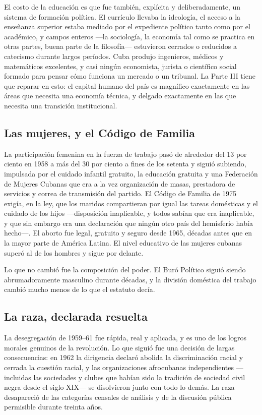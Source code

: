 El costo de la educación es que fue también, explícita y deliberadamente, un
sistema de formación política. El currículo llevaba la ideología, el acceso a la
enseñanza superior estaba mediado por el expediente político tanto como por el
académico, y campos enteros ---la sociología, la economía tal como se practica en
otras partes, buena parte de la filosofía--- estuvieron cerrados o reducidos a
catecismo durante largos períodos. Cuba produjo ingenieros, médicos y matemáticos
excelentes, y casi ningún economista, jurista o científico social formado para
pensar cómo funciona un mercado o un tribunal. La Parte III tiene que reparar en
esto: el capital humano del país es magnífico exactamente en las áreas que
necesita una economía técnica, y delgado exactamente en las que necesita una
transición institucional.

\subsection{Las mujeres, y el Código de Familia}

La participación femenina en la fuerza de trabajo pasó de alrededor del 13 por
ciento en 1958 a más del 30 por ciento a fines de los setenta y siguió subiendo,
impulsada por el cuidado infantil gratuito, la educación gratuita y una
Federación de Mujeres Cubanas que era a la vez organización de masas, prestadora
de servicios y correa de transmisión del partido. El Código de Familia de 1975
exigía, en la ley, que los maridos compartieran por igual las tareas domésticas y
el cuidado de los hijos ---disposición inaplicable, y todos sabían que era
inaplicable, y que sin embargo era una declaración que ningún otro país del
hemisferio había hecho---. El aborto fue legal, gratuito y seguro desde 1965,
décadas antes que en la mayor parte de América Latina. El nivel educativo de las
mujeres cubanas superó al de los hombres y sigue por delante.

Lo que no cambió fue la composición del poder. El Buró Político siguió siendo
abrumadoramente masculino durante décadas, y la división doméstica del trabajo
cambió mucho menos de lo que el estatuto decía.

\subsection{La raza, declarada resuelta}

La desegregación de 1959--61 fue rápida, real y aplicada, y es uno de los logros
morales genuinos de la revolución. Lo que siguió fue una decisión de largas
consecuencias: en 1962 la dirigencia declaró abolida la discriminación racial y
cerrada la cuestión racial, y las organizaciones afrocubanas independientes
---incluidas las sociedades y clubes que habían sido la tradición de sociedad
civil negra desde el siglo XIX--- se disolvieron junto con todo lo demás. La raza
desapareció de las categorías censales de análisis y de la discusión pública
permisible durante treinta años.

